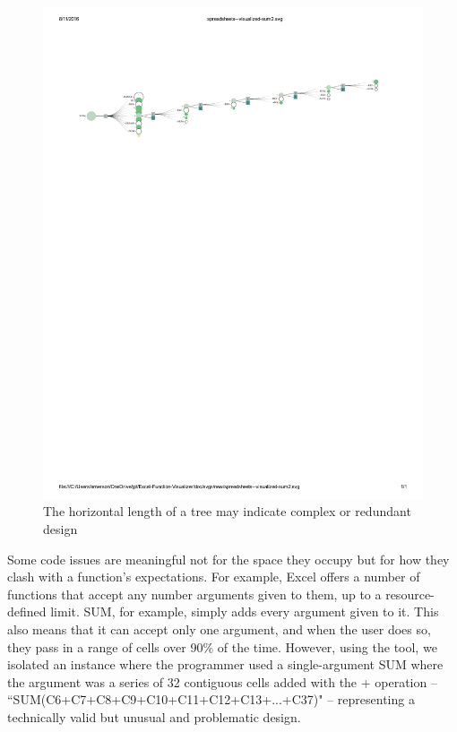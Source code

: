 \documentclass[conference]{IEEEtran}
\begin{document}
	\begin{figure}[h] \centering \includegraphics[width=\textwidth]{longsum}
		\caption{The horizontal length of a tree may indicate complex or redundant
			design} \label{fig:longsum} \end{figure}
	
	Some code issues are meaningful not for the space they occupy but for how they
	clash with a function's expectations. For example, Excel offers a number of
	functions that accept any number arguments given to them, up to a
	resource-defined limit. SUM, for example, simply adds every argument given to
	it. This also means that it can accept only one argument, and when the user
	does so, they pass in a range of cells over 90\% of the time. However, using
	the tool, we isolated an instance where the programmer used a single-argument
	SUM where the argument was a series of 32 contiguous cells added with the +
	operation -- ``SUM(C6+C7+C8+C9+C10+C11+C12+C13+...+C37)" -- representing a
	technically valid but unusual and problematic design.\par
	
\end{document}
